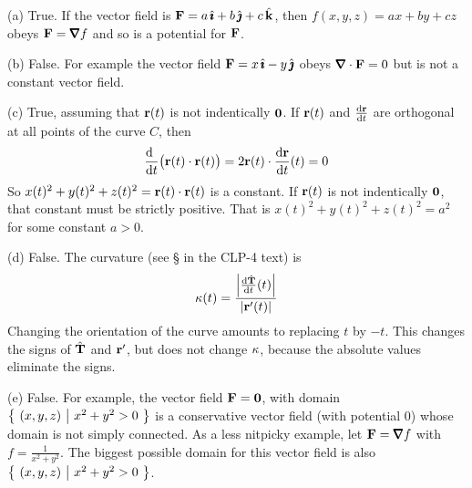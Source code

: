 \begin{solution} 
(a) True. If the vector field is $\mathbf{F} = a\,\hat{\pmb{\imath}} +b\,\hat{\pmb{\jmath}} + c\,\hat{\mathbf{k}}$,
then $f(x,y,z) = ax + by + cz$ obeys $\vF=\vnabla f$ and so
is a potential for $\mathbf{F}$.

(b) False. For example the vector field $\mathbf{F}= x\,\hat{\pmb{\imath}}-y\,\hat{\pmb{\jmath}}$
obeys $\vnabla\cdot\vF= 0$ but is not a constant vector field.

(c) True, assuming that $\mathbf{r}(t)$ is not indentically $\mathbf{0}$.
If $\mathbf{r}(t)$ and $\diff{\vr}{t}$ are orthogonal at all
points of the curve $C$, then
\begin{equation*}
\diff{\hfill}{t} \big(\vr(t)\cdot\vr(t)\big)
  = 2\vr(t)\cdot\diff{\vr}{t}(t)
  =0
\end{equation*}
So $x(t)^2 + y(t)^2 + z(t)^2 = \mathbf{r}(t)\cdot\mathbf{r}(t)$ is a constant.
If $\mathbf{r}(t)$ is not indentically $\mathbf{0}$, that constant must
be strictly positive. That is $x(t)^2 + y(t)^2 + z(t)^2 = a^2$
for some constant $a>0$.

(d) False. The curvature (see \S{}
in the CLP-4 text) is
\begin{equation*}
\ka(t)= \frac{\Big|\diff{\hat\vT}{t}(t)\Big|}{|\vr'(t)|}
\end{equation*}
Changing the orientation of the curve amounts to replacing $t$ by $-t$.
This changes the signs of $\hat{\mathbf{T}}$ and $\mathbf{r}'$,
but does not change $\kappa$, because the absolute values eliminate the signs.

(e) False. For example, the vector field $\mathbf{F}=\mathbf{0}$, with domain
$\big\{ \ (x,y,z)\ \big|\ x^2+y^2>0\ \big\}$ is a conservative vector field 
(with potential $0$) whose domain is not simply connected. As a less
nitpicky example, let $\vF=\vnabla f$ with $f=\frac{1}{x^2+y^2}$. The biggest
possible domain for this vector field is also $\big\{ \ (x,y,z)\ \big|\ x^2+y^2>0\ \big\}$.
\end{solution}

